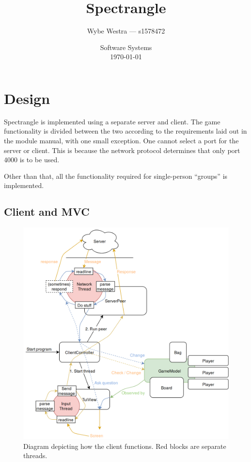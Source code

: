 \documentclass[12pt, letterpaper]{article}
\title{Spectrangle}
\author{Wybe Westra --- s1578472}
\date{Software Systems \\ \today}
\begin{document}
    \maketitle

    \newpage

    \tableofcontents

    \newpage


    \section{Design}

    Spectrangle is implemented using a separate server and client.
    The game functionality is divided between the two according to the requirements laid out in the module manual,
    with one small exception.
    One cannot select a port for the server or client.
    This is because the network protocol determines that only port 4000 is to be used.

    Other than that, all the functionality required for single-person ``groups'' is implemented.


    \subsection{Client and MVC}

    \begin{figure}[ht]
        \begin{center}
            \includegraphics[width=\textwidth]{Client.png}
            \caption{Diagram depicting how the client functions.
            Red blocks are separate threads.}
            \label{fig:clientDiagram}
        \end{center}
    \end{figure}
\end{document}
